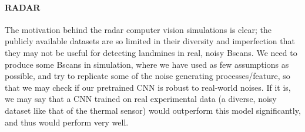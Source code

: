     \paragraph{RADAR} 
    
        The motivation behind the radar computer vision simulations is clear; the publicly available datasets are so limited in their diversity and imperfection that they may not be useful for detecting landmines in real, noisy Bscans. We need to produce some Bscans in simulation, where we have used as few assumptions as possible, and try to replicate some of the noise generating processes/feature, so that we may check if our pretrained CNN is robust to real-world noises. If it is, we may say that a CNN trained on real experimental data (a diverse, noisy dataset like that of the thermal sensor) would outperform this model significantly, and thus would perform very well.



